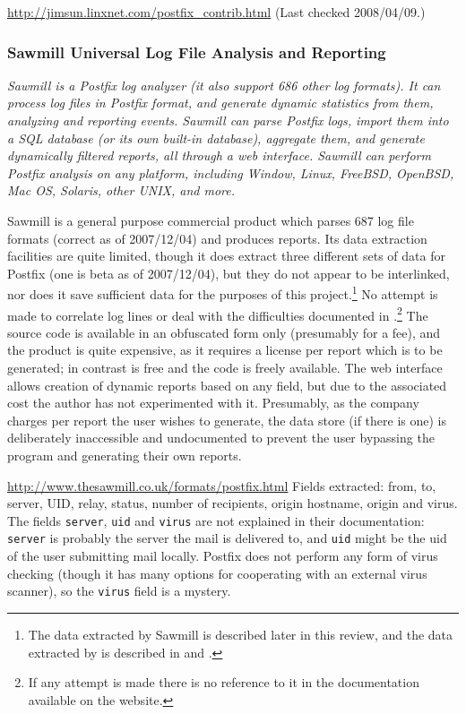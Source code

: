 \url{http://jimsun.linxnet.com/postfix_contrib.html} \newline (Last checked
2008/04/09.)

\subsubsection{Sawmill Universal Log File Analysis and Reporting}

\textit{ Sawmill is a Postfix log analyzer (it also support 686 other log
formats).  It can process log files in Postfix format, and generate dynamic
statistics from them, analyzing and reporting events.  Sawmill can parse
Postfix logs, import them into a SQL database (or its own built-in
database), aggregate them, and generate dynamically filtered reports, all
through a web interface.  Sawmill can perform Postfix analysis on any
platform, including Window, Linux, FreeBSD, OpenBSD, Mac OS, Solaris, other
UNIX, and more.\/}

Sawmill is a general purpose commercial product which parses 687 log file
formats (correct as of 2007/12/04) and produces reports.  Its data
extraction facilities are quite limited, though it does extract three
different sets of data for Postfix (one is beta as of 2007/12/04), but they
do not appear to be interlinked, nor does it save sufficient data for the
purposes of this project.\footnote{The data extracted by Sawmill is
described later in this review, and the data extracted by \PLP{} is
described in  and .}  No attempt is made to correlate log lines or deal with the
difficulties documented in 
.\footnote{If any attempt is made
there is no reference to it in the documentation available on the website.}
The source code is available in an obfuscated form only (presumably for a
fee), and the product is quite expensive, as it requires a license per
report which is to be generated; in contrast \parsername{} is free and the
code is freely available.  The web interface allows creation of dynamic
reports based on any field, but due to the associated cost the author has
not experimented with it.  Presumably, as the company charges per report
the user wishes to generate, the data store (if there is one) is
deliberately inaccessible and undocumented to prevent the user bypassing
the program and generating their own reports.

\url{http://www.thesawmill.co.uk/formats/postfix.html} \newline Fields
extracted: from, to, server, UID, relay, status, number of recipients,
origin hostname, origin \IP{} and virus.  The fields \texttt{server},
\texttt{uid} and \texttt{virus} are not explained in their documentation:
\texttt{server} is probably the server the mail is delivered to, and
\texttt{uid} might be the uid of the user submitting mail locally.  Postfix
does not perform any form of virus checking (though it has many options for
cooperating with an external virus scanner), so the \texttt{virus} field is
a mystery.

